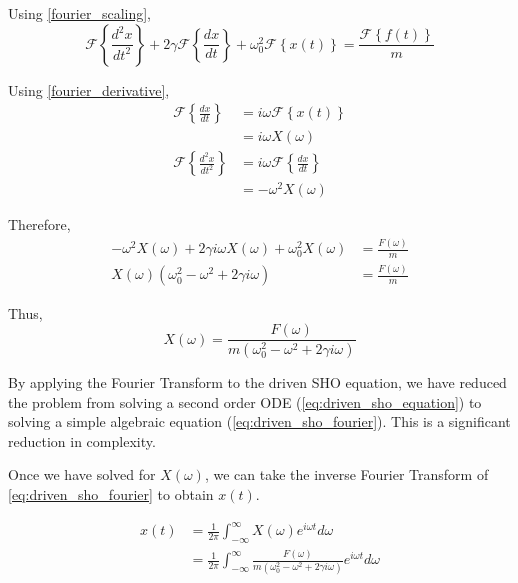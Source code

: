 \noindent
Using \cref{fourier_scaling},
\begin{equation} 
    \mathcal{F} \left\{ \frac{d^2 x}{dt^2} \right\} + 2 \gamma \mathcal{F} \left\{ \frac{dx}{dt} \right\} + \omega_0^2 \mathcal{F} \left\{ x(t) \right\} = \frac{\mathcal{F} \left\{ f(t) \right\}}{m} 
\end{equation}

\noindent
Using \cref{fourier_derivative},
\begin{align}
    \mathcal{F} \left\{ \frac{dx}{dt} \right\} &= i \omega \mathcal{F} \left\{ x(t) \right\} \\
    &= i \omega X(\omega) \\
    \mathcal{F} \left\{ \frac{d^2 x}{d t^2} \right\} & = i \omega \mathcal{F} \left\{ \frac{dx}{dt} \right\} \\
    & = -\omega^2 X(\omega)
\end{align}

\noindent
Therefore,
\begin{align}
    -\omega^2 X(\omega) + 2 \gamma i \omega X(\omega) + \omega_0^2 X(\omega) &= \frac{F(\omega)}{m} \\
    X(\omega) \left( \omega_0^2 - \omega^2 + 2 \gamma i \omega \right) &= \frac{F(\omega)}{m}
\end{align}

\noindent
Thus,
\begin{equation} \label{eq:driven_sho_fourier}
    X(\omega) = \frac{F(\omega)}{m \left( \omega_0^2 - \omega^2 + 2 \gamma i \omega \right)}
\end{equation}

By applying the Fourier Transform to the driven SHO equation, we have reduced the problem from solving a second order ODE (\cref{eq:driven_sho_equation}) to solving a simple algebraic equation (\cref{eq:driven_sho_fourier}). This is a significant reduction in complexity.

Once we have solved for \(X(\omega)\), we can take the inverse Fourier Transform of \cref{eq:driven_sho_fourier} to obtain \(x(t)\).

\begin{align} \label{eq:driven_sho_inverse_fourier}
    x(t) &= \frac{1}{2 \pi} \int_{-\infty}^{\infty} X(\omega) e^{i \omega t} d\omega \\
    &= \frac{1}{2 \pi} \int_{-\infty}^{\infty} \frac{F(\omega)}{m \left( \omega_0^2 - \omega^2 + 2 \gamma i \omega \right)} e^{i \omega t} d\omega
\end{align}

